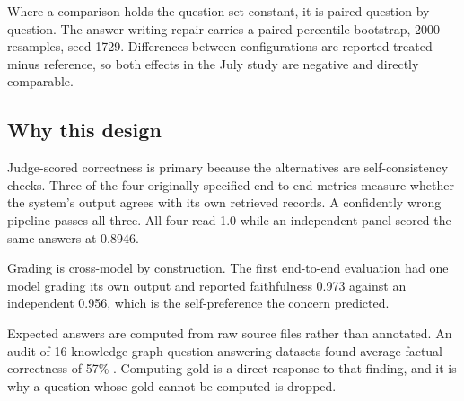 Where a comparison holds the question set constant, it is paired question by
question. The answer-writing repair carries a paired percentile bootstrap, 2000
resamples, seed 1729. Differences between configurations are reported treated
minus reference, so both effects in the July study are negative and directly
comparable.

\subsection{Why this design}

Judge-scored correctness is primary because the alternatives are
self-consistency checks. Three of the four originally specified end-to-end
metrics measure whether the system's output agrees with its own retrieved
records. A confidently wrong pipeline passes all three. All four read 1.0 while
an independent panel scored the same answers at 0.8946.

Grading is cross-model by construction. The first end-to-end evaluation had one
model grading its own output and reported faithfulness 0.973 against an
independent 0.956, which is the self-preference the concern predicted.

Expected answers are computed from raw source files rather than annotated. An
audit of 16 knowledge-graph question-answering datasets found average factual
correctness of 57\% \citep{kgqagen}. Computing gold is a direct response to that
finding, and it is why a question whose gold cannot be computed is dropped.
